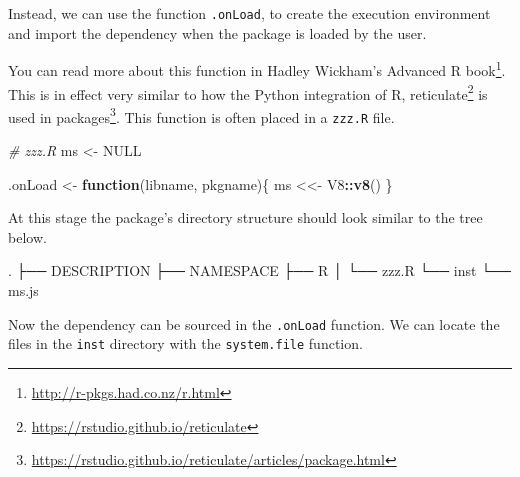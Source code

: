 \documentclass[
]{krantz}
\makeatletter
\newenvironment{Shaded}{\begin{snugshade}}{\end{snugshade}}
\newcommand{\CommentTok}[1]{\textcolor[rgb]{0.37,0.37,0.37}{\textit{#1}}}
\newcommand{\ControlFlowTok}[1]{\textcolor[rgb]{0.27,0.27,0.27}{\textbf{#1}}}
\newcommand{\DataTypeTok}[1]{\textcolor[rgb]{0.27,0.27,0.27}{#1}}
\newcommand{\ExtensionTok}[1]{#1}
\newcommand{\KeywordTok}[1]{\textcolor[rgb]{0.27,0.27,0.27}{\textbf{#1}}}
\newcommand{\NormalTok}[1]{#1}
\newcommand{\OperatorTok}[1]{\textcolor[rgb]{0.43,0.43,0.43}{\textbf{#1}}}
\newcommand{\OtherTok}[1]{\textcolor[rgb]{0.37,0.37,0.37}{#1}}
\newcommand{\StringTok}[1]{\textcolor[rgb]{0.5,0.5,0.5}{#1}}
\renewcommand{\href}[2]{#2\footnote{\url{#1}}}
\newenvironment{kframe}{%
\medskip{}
\setlength{\fboxsep}{.8em}
 \def\at@end@of@kframe{}%
 \ifinner\ifhmode%
  \def\at@end@of@kframe{\end{minipage}}%
  \begin{minipage}{\columnwidth}%
 \fi\fi%
 \def\FrameCommand##1{\hskip\@totalleftmargin \hskip-\fboxsep
 \colorbox{shadecolor}{##1}\hskip-\fboxsep
     \hskip-\linewidth \hskip-\@totalleftmargin \hskip\columnwidth}%
 \MakeFramed {\advance\hsize-\width
   \@totalleftmargin\z@ \linewidth\hsize
   \@setminipage}}%
 {\par\unskip\endMakeFramed%
 \at@end@of@kframe}
\renewenvironment{Shaded}{\begin{kframe}}{\end{kframe}}
\makeatother
\begin{document}
Instead, we can use the function \texttt{.onLoad}, to create the execution environment and import the dependency when the package is loaded by the user.

You can read more about this function in Hadley Wickham's \href{http://r-pkgs.had.co.nz/r.html}{Advanced R book}. This is in effect very similar to how the Python integration of R, \href{https://rstudio.github.io/reticulate}{reticulate} \citep{R-reticulate} is \href{https://rstudio.github.io/reticulate/articles/package.html}{used in packages}. This function is often placed in a \texttt{zzz.R} file.

\begin{Shaded}
\begin{Highlighting}[]
\CommentTok{\# zzz.R}
\NormalTok{ms <{-}}\StringTok{ }\OtherTok{NULL}

\NormalTok{.onLoad <{-}}\StringTok{ }\ControlFlowTok{function}\NormalTok{(libname, pkgname)\{}
\NormalTok{  ms <<{-}}\StringTok{ }\NormalTok{V8}\OperatorTok{::}\KeywordTok{v8}\NormalTok{()}
\NormalTok{\}}
\end{Highlighting}
\end{Shaded}

At this stage the package's directory structure should look similar to the tree below.

\begin{Shaded}
\begin{Highlighting}[]
\ExtensionTok{.}
\NormalTok{├── }\ExtensionTok{DESCRIPTION}
\NormalTok{├── }\ExtensionTok{NAMESPACE}
\NormalTok{├── }\ExtensionTok{R}
\NormalTok{│   └── }\ExtensionTok{zzz.R}
\NormalTok{└── }\ExtensionTok{inst}
\NormalTok{    └── }\ExtensionTok{ms.js}
\end{Highlighting}
\end{Shaded}

Now the dependency can be sourced in the \texttt{.onLoad} function. We can locate the files in the \texttt{inst} directory with the \texttt{system.file} function.

\begin{Shaded}
\end{Shaded}
\end{document}
